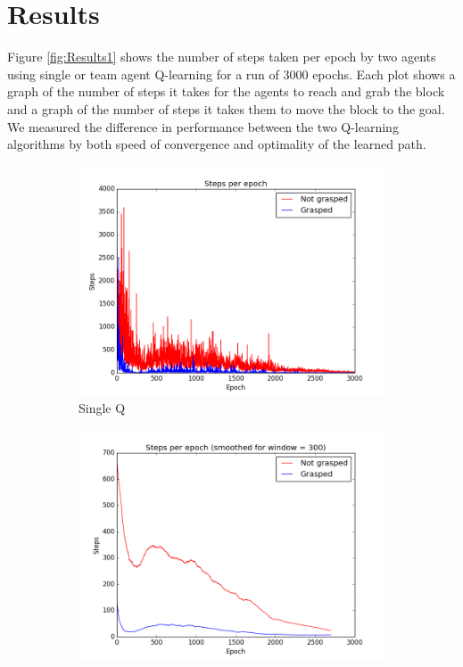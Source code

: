 \section{Results}
Figure \ref{fig:Results1} shows the number of steps taken per epoch by two agents using single or team agent Q-learning for a run of 3000 epochs. Each plot shows a graph of the number of steps it takes for the agents to reach and grab the block and a graph of the number of steps it takes them to move the block to the goal. We measured the difference in performance between the two Q-learning algorithms by both speed of convergence and optimality of the learned path. 

\begin{figure}
	\centering
	\begin{subfigure}{.48\textwidth}
		\includegraphics[width=\textwidth]{images/SingleQ.png}
		\caption{Single Q}
	\end{subfigure}
	\begin{subfigure}{0.48\textwidth}
		\includegraphics[width=\textwidth]{images/SingleQ_smoothed.png}

\end{subfigure}
\end{figure}
